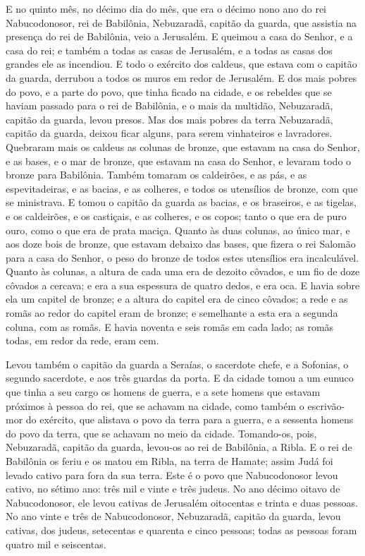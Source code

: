 E no quinto mês, no décimo dia do mês, que era o décimo nono ano
do rei Nabucodonosor, rei de Babilônia, Nebuzaradã, capitão da
guarda, que assistia na presença do rei de Babilônia, veio a
Jerusalém. E queimou a casa do Senhor, e a casa do rei; e
também a todas as casas de Jerusalém, e a todas as casas dos grandes
ele as incendiou. E todo o exército dos caldeus, que estava
com o capitão da guarda, derrubou a todos os muros em redor de
Jerusalém. E dos mais pobres do povo, e a parte do povo, que
tinha ficado na cidade, e os rebeldes que se haviam passado para o
rei de Babilônia, e o mais da multidão, Nebuzaradã, capitão da
guarda, levou presos. Mas dos mais pobres da terra
Nebuzaradã, capitão da guarda, deixou ficar alguns, para serem
vinhateiros e lavradores. Quebraram mais os caldeus as
colunas de bronze, que estavam na casa do Senhor, e as bases, e o
mar de bronze, que estavam na casa do Senhor, e levaram todo o
bronze para Babilônia. Também tomaram os caldeirões, e as
pás, e as espevitadeiras, e as bacias, e as colheres, e todos os
utensílios de bronze, com que se ministrava. E tomou o
capitão da guarda as bacias, e os braseiros, e as tigelas, e os
caldeirões, e os castiçais, e as colheres, e os copos; tanto o que
era de puro ouro, como o que era de prata maciça. Quanto às
duas colunas, ao único mar, e aos doze bois de bronze, que estavam
debaixo das bases, que fizera o rei Salomão para a casa do Senhor, o
peso do bronze de todos estes utensílios era incalculável.
Quanto às colunas, a altura de cada uma era de dezoito
côvados, e um fio de doze côvados a cercava; e era a sua espessura
de quatro dedos, e era oca. E havia sobre ela um capitel de
bronze; e a altura do capitel era de cinco côvados; a rede e as
romãs ao redor do capitel eram de bronze; e semelhante a esta era a
segunda coluna, com as romãs. E havia noventa e seis romãs em
cada lado; as romãs todas, em redor da rede, eram cem.

Levou também o capitão da guarda a Seraías, o sacerdote chefe, e
a Sofonias, o segundo sacerdote, e aos três guardas da porta.
E da cidade tomou a um eunuco que tinha a seu cargo os homens
de guerra, e a sete homens que estavam próximos à pessoa do rei, que
se achavam na cidade, como também o escrivão-mor do exército, que
alistava o povo da terra para a guerra, e a sessenta homens do povo
da terra, que se achavam no meio da cidade. Tomando-os, pois,
Nebuzaradã, capitão da guarda, levou-os ao rei de Babilônia, a
Ribla. E o rei de Babilônia os feriu e os matou em Ribla, na
terra de Hamate; assim Judá foi levado cativo para fora da sua
terra. Este é o povo que Nabucodonosor levou cativo, no
sétimo ano: três mil e vinte e três judeus. No ano décimo
oitavo de Nabucodonosor, ele levou cativas de Jerusalém oitocentas e
trinta e duas pessoas. No ano vinte e três de Nabucodonosor,
Nebuzaradã, capitão da guarda, levou cativas, dos judeus, setecentas
e quarenta e cinco pessoas; todas as pessoas foram quatro mil e
seiscentas.

